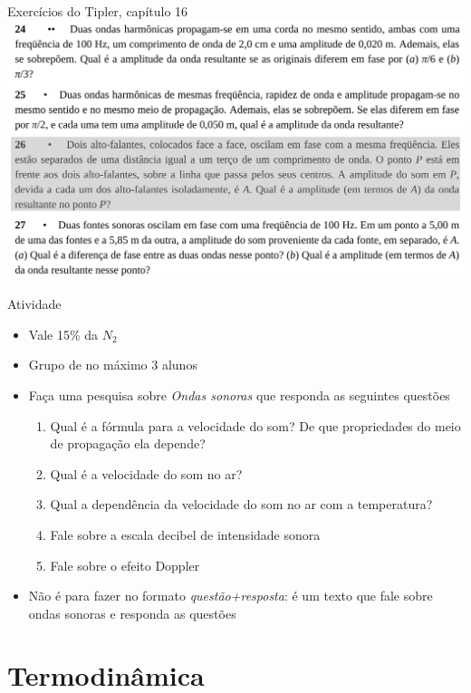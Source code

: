 \documentclass[t,%
brazilian,%
11pt,%
aspectratio=169,%
table%
]{beamer}
\begin{document}
\begin{frame}{Exercícios do Tipler, capítulo 16}
    \centering
    \includegraphics[height=\textheight-28pt]{images/Captura de tela de 2024-01-30 10-31-40.png}
\end{frame}

\begin{frame}{Atividade}
    \begin{itemize}
        \item Vale 15\% da \(N_2\)
        \item Grupo de no máximo 3 alunos
        \item Faça uma pesquisa sobre \textit{Ondas sonoras} que responda as seguintes questões
            \begin{enumerate}
                \item  Qual é a fórmula para a velocidade do som? De que propriedades do meio de propagação ela depende?
                \item  Qual é a velocidade do som no ar? 
                \item  Qual a dependência da velocidade do som no ar com a temperatura?
                \item  Fale sobre a escala decibel de intensidade sonora
                \item  Fale sobre o efeito Doppler
            \end{enumerate}
        \item \alert{Não é para fazer no formato \textit{questão+resposta}: é um texto
            que fale sobre ondas sonoras e responda as questões}
    \end{itemize}
\end{frame}


\section{Termodinâmica}
\end{document}
